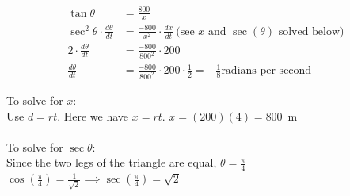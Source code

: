 \documentclass[nooutcomes]{ximera}
\begin{document}
\begin{problem}
\begin{freeResponse}
	\begin{align*}
	\tan {\theta}&=\frac{800}{x}\\
	\sec^2{\theta} \cdot \frac{d\theta}{dt}&=\frac{-800}{x^2}\cdot \frac{dx}{dt}\ \text{(see $x$ and $\sec(\theta)$ solved below)}\\
	2 \cdot \frac{d\theta}{dt}&=\frac{-800}{800^2}\cdot 200  \\
	\frac{d\theta}{dt}&=\frac{-800}{800^2}\cdot 200 \cdot \frac{1}{2}=-\frac{1}{8} \text{radians per second}
	\end{align*}

To solve for $x$:\\
Use $d=rt$.  Here we have $x=rt$.  $x=(200)(4)=800$\ m  \\\\

To solve for $\sec{\theta}$:\\
Since the two legs of the triangle are equal, $\theta=\frac{\pi}{4}$\\
$\cos\left({\frac{\pi}{4}}\right)=\frac{1}{\sqrt{2}} \implies \sec\left({\frac{\pi}{4}}\right)=\sqrt{2}$





\end{freeResponse}
\end{problem}
\end{document}
